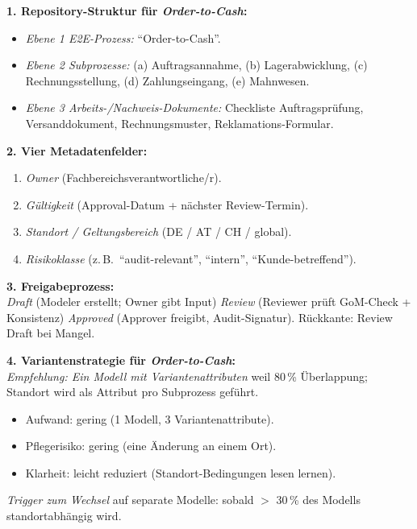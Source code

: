 \documentclass[11pt,a4paper,oneside]{article}
\begin{document}
\begin{loesungbox}
\textbf{1. Repository-Struktur f\"ur \emph{Order-to-Cash}:}
\begin{itemize}
  \item \emph{Ebene 1 \textendash{} E2E-Prozess:} ``Order-to-Cash''.
  \item \emph{Ebene 2 \textendash{} Subprozesse:} (a) Auftragsannahme, (b) Lagerabwicklung, (c) Rechnungsstellung, (d) Zahlungseingang, (e) Mahnwesen.
  \item \emph{Ebene 3 \textendash{} Arbeits-/Nachweis-Dokumente:} Checkliste Auftragspr\"ufung, Versanddokument, Rechnungsmuster, Reklamations-Formular.
\end{itemize}

\smallskip
\textbf{2. Vier Metadatenfelder:}
\begin{enumerate}
  \item \emph{Owner} (Fachbereichsverantwortliche/r).
  \item \emph{G\"ultigkeit} (Approval-Datum + n\"achster Review-Termin).
  \item \emph{Standort / Geltungsbereich} (DE / AT / CH / global).
  \item \emph{Risikoklasse} (z.\,B.\ ``audit-relevant'', ``intern'', ``Kunde-betreffend'').
\end{enumerate}

\smallskip
\textbf{3. Freigabeprozess:}\\
\emph{Draft} (Modeler erstellt; Owner gibt Input) \textrightarrow{} \emph{Review} (Reviewer pr\"uft GoM-Check + Konsistenz) \textrightarrow{} \emph{Approved} (Approver freigibt, Audit-Signatur). R\"uckkante: Review \textrightarrow{} Draft bei Mangel.

\smallskip
\textbf{4. Variantenstrategie f\"ur \emph{Order-to-Cash}:}\\
\emph{Empfehlung: Ein Modell mit Variantenattributen} \textendash{} weil 80\,\% \"Uberlappung; Standort wird als Attribut pro Subprozess gef\"uhrt.
\begin{itemize}
  \item Aufwand: gering (1 Modell, 3 Variantenattribute).
  \item Pflegerisiko: gering (eine \"Anderung an einem Ort).
  \item Klarheit: leicht reduziert (Standort-Bedingungen lesen lernen).
\end{itemize}
\emph{Trigger zum Wechsel} auf separate Modelle: sobald $>$ 30\,\% des Modells standort\-abh\"angig wird.
\end{loesungbox}
\end{document}

